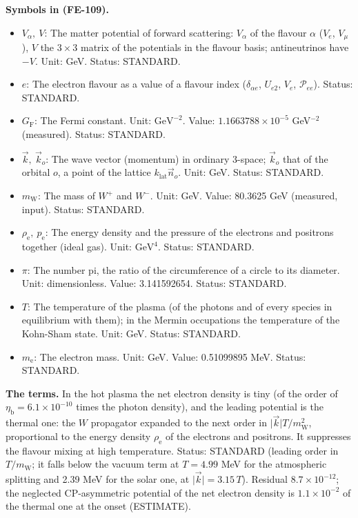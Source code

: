 \documentclass[
  10pt,
]{article}
\providecommand{\tightlist}{%
  \setlength{\itemsep}{0pt}\setlength{\parskip}{0pt}}
\begin{document}
\textbf{Symbols in (FE-109).}

\begin{itemize}
\tightlist
\item
  \(V_\alpha,\ V\): The matter potential of forward scattering:
  \(V_\alpha\) of the flavour \(\alpha\) (\(V_e\), \(V_\mu\)), \(V\) the
  \(3 \times 3\) matrix of the potentials in the flavour basis;
  antineutrinos have \(-V\). Unit: GeV. Status: STANDARD.
\item
  \(e\): The electron flavour as a value of a flavour index
  (\(\delta_{\alpha e}\), \(U_{e2}\), \(V_e\), \(\mathcal{P}_{ee}\)).
  Status: STANDARD.
\item
  \(G_{\mathrm{F}}\): The Fermi constant. Unit: \(\mathrm{GeV}^{-2}\).
  Value: \(1.1663788\times10^{-5}\) GeV\(^{-2}\) (measured). Status:
  STANDARD.
\item
  \(\vec k,\ \vec k_o\): The wave vector (momentum) in ordinary 3-space;
  \(\vec k_o\) that of the orbital \(o\), a point of the lattice
  \(k_{\mathrm{lat}}\vec n_o\). Unit: GeV. Status: STANDARD.
\item
  \(m_{\mathrm{W}}\): The mass of \(W^+\) and \(W^-\). Unit: GeV. Value:
  80.3625 GeV (measured, input). Status: STANDARD.
\item
  \(\rho_{\mathrm{e}},\ p_{\mathrm{e}}\): The energy density and the
  pressure of the electrons and positrons together (ideal gas). Unit:
  \(\mathrm{GeV}^{4}\). Status: STANDARD.
\item
  \(\pi\): The number pi, the ratio of the circumference of a circle to
  its diameter. Unit: dimensionless. Value: 3.141592654. Status:
  STANDARD.
\item
  \(T\): The temperature of the plasma (of the photons and of every
  species in equilibrium with them); in the Mermin occupations the
  temperature of the Kohn-Sham state. Unit: GeV. Status: STANDARD.
\item
  \(m_{\mathrm{e}}\): The electron mass. Unit: GeV. Value: 0.51099895
  MeV. Status: STANDARD.
\end{itemize}

\textbf{The terms.} In the hot plasma the net electron density is tiny
(of the order of \(\eta_{\mathrm{b}} = 6.1\times10^{-10}\) times the
photon density), and the leading potential is the thermal one: the \(W\)
propagator expanded to the next order in
\(\lvert\vec k\rvert T/m_{\mathrm{W}}^2\), proportional to the energy
density \(\rho_{\mathrm{e}}\) of the electrons and positrons. It
suppresses the flavour mixing at high temperature. Status: STANDARD
(leading order in \(T/m_{\mathrm{W}}\); it falls below the vacuum term
at \(T = 4.99\) MeV for the atmospheric splitting and 2.39 MeV for the
solar one, at \(\lvert\vec k\rvert = 3.15\,T\)). Residual
\(8.7\times10^{-12}\); the neglected CP-asymmetric potential of the net
electron density is \(1.1\times10^{-2}\) of the thermal one at the onset
(ESTIMATE).
\end{document}
